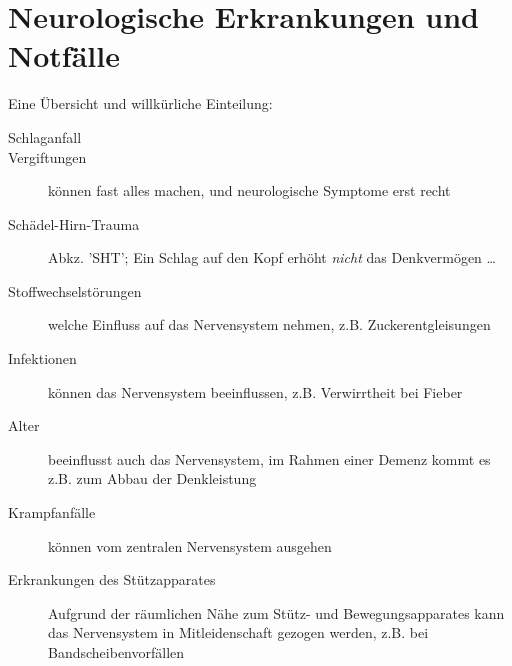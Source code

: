 




\clearpage
\section{Neurologische Erkrankungen und Notfälle}


Eine Übersicht und willkürliche Einteilung:

\begin{description}
  \item [Schlaganfall]
  \item [Vergiftungen] können fast alles machen, und neurologische Symptome erst recht
  \item [Schädel-Hirn-Trauma] Abkz. 'SHT'; Ein Schlag auf
  den Kopf erhöht \emph{nicht} das Denkvermögen \ldots
  \item [Stoffwechselstörungen] welche Einfluss auf das Nervensystem nehmen, z.B. Zuckerentgleisungen
  \item [Infektionen] können das Nervensystem beeinflussen, z.B. Verwirrtheit bei Fieber
  \item [Alter] beeinflusst auch das Nervensystem, im Rahmen einer Demenz kommt es z.B. zum Abbau der Denkleistung
  \item [Krampfanfälle] können vom zentralen Nervensystem ausgehen
  \item [Erkrankungen des Stützapparates] Aufgrund der räumlichen Nähe zum Stütz- und Bewegungsapparates kann das Nervensystem in Mitleidenschaft gezogen werden, z.B. bei Bandscheibenvorfällen
\end{description}

